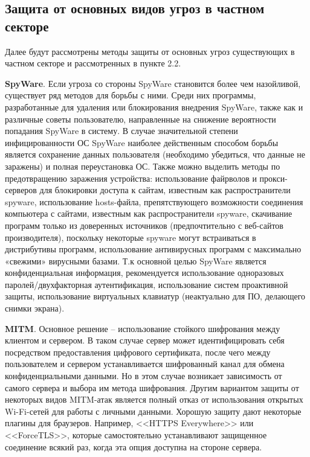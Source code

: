 \subsection{Защита от основных видов угроз в частном секторе} 
Далее будут рассмотрены методы защиты от основных угроз существующих в частном секторе и рассмотренных в пункте 2.2.

\textbf{SpyWare}. Если угроза со стороны SpyWare становится более чем назойливой, существует ряд методов для борьбы с ними. Среди них программы, разработанные для удаления или блокирования внедрения SpyWare, также как и различные советы пользователю, направленные на снижение вероятности попадания SpyWare в систему. В случае значительной степени инфицированности ОС SpyWare наиболее действенным способом борьбы является сохранение данных пользователя (необходимо убедиться, что данные не заражены) и полная переустановка ОС. Также можно выделить методы по предотвращению заражения устройства: использование файрволов и прокси-серверов для блокировки доступа к сайтам, известным как распространители spyware, использование hosts-файла, препятствующего возможности соединения компьютера с сайтами, известным как распространители spyware, скачивание программ только из доверенных источников (предпочтительно с веб-сайтов производителя), поскольку некоторые spyware могут встраиваться в дистрибутивы программ, использование антивирусных программ с максимально «свежими» вирусными базами. Т.к основной целью SpyWare является конфиденциальная информация, рекомендуется  использование  одноразовых паролей/двухфакторная аутентификация, использование систем проактивной защиты, использование виртуальных клавиатур (неактуально для ПО, делающего снимки экрана).

\textbf{MITM}. Основное решение -- использование стойкого шифрования между клиентом и сервером. В таком случае сервер может идентифицировать себя посредством предоставления цифрового сертификата, после чего между пользователем и сервером устанавливается шифрованный канал для обмена конфиденциальными данными. Но в этом случае возникает зависимость от самого сервера и выбора им метода шифрования. Другим вариантом защиты от некоторых видов MITM-атак является полный отказ от использования открытых Wi-Fi-сетей для работы с личными данными. Хорошую защиту дают некоторые плагины для браузеров. Например, <<HTTPS Everywhere>> или <<ForceTLS>>, которые самостоятельно устанавливают защищенное соединение всякий раз, когда эта опция доступна на стороне сервера. %

